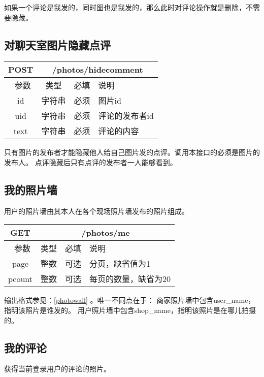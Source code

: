 如果一个评论是我发的，同时图也是我发的，那么此时对评论操作就是删除，不需要隐藏。


\subsection{对聊天室图片隐藏点评}

\begin{table}[H]
   \begin{center}
\begin{tabular}{|c|c|c|p{12cm}|}
\hline
POST & \multicolumn{3}{|c|}{/photos/hidecomment} \\
\hline\hline
 \  参数  & 类型 & 必填 &  说明  \\
  \hline
 id  & 字符串 & 必须 & 图片id\\
  \hline
 uid  & 字符串 & 必须 & 评论的发布者id\\
   \hline
 text  & 字符串 & 必须 & 评论的内容\\
\hline
\end{tabular}
   \end{center}
\end{table}
只有图片的发布者才能隐藏他人给自己图片发的点评。调用本接口的必须是图片的发布人。
点评隐藏后只有点评的发布者一人能够看到。


\subsection{我的照片墙}
用户的照片墙由其本人在各个现场照片墙发布的照片组成。

\begin{table}[H]
   \begin{center}
\begin{tabular}{|c|c|c|p{12cm}|}
\hline
GET & \multicolumn{3}{|c|}{/photos/me} \\
\hline\hline
 \  参数  & 类型 & 必填 &  说明  \\
\hline
 page  & 整数 & 可选 & 分页，缺省值为1\\ 
 \hline
 pcount  & 整数 & 可选 & 每页的数量，缺省为20\\ 
\hline
\end{tabular}
   \end{center}
\end{table}

输出格式参见：\ref{photowall} 。唯一不同点在于：
商家照片墙中包含user\_name，指明该照片是谁发的。
用户照片墙中包含shop\_name，指明该照片是在哪儿拍摄的。


\subsection{我的评论}
获得当前登录用户的评论的照片。

